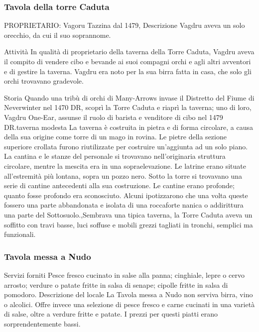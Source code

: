 \documentclass{article}
\begin{document}
              \subsubsection{Tavola della torre Caduta}
PROPRIETARIO: Vagoru Tazzina dal 1479, Descrizione
Vagdru aveva un solo orecchio, da cui il suo soprannome.


Attività
In qualità di proprietario della taverna della Torre Caduta, Vagdru aveva il compito di vendere cibo e bevande ai suoi compagni orchi e agli altri avventori e di gestire la taverna. Vagdru era noto per la sua birra fatta in casa, che solo gli orchi trovavano gradevole.

Storia
Quando una tribù di orchi di Many-Arrows invase il Distretto del Fiume di Neverwinter nel 1470 DR, scoprì la Torre Caduta e riaprì la taverna; uno di loro, Vagdru One-Ear, assunse il ruolo di barista e venditore di cibo nel 1479 DR.taverna modesta
La taverna è costruita in pietra e di forma circolare, a causa della sua origine come torre di un mago in rovina. Le pietre della sezione superiore crollata furono riutilizzate per costruire un'aggiunta ad un solo piano. La cantina e le stanze del personale si trovavano nell'originaria struttura circolare, mentre la mescita era in una sopraelevazione. Le latrine erano situate all'estremità più lontana, sopra un pozzo nero. Sotto la torre si trovavano una serie di cantine antecedenti alla sua costruzione. Le cantine erano profonde; quanto fosse profondo era sconosciuto. Alcuni ipotizzarono che una volta queste fossero una parte abbandonata e isolata di una roccaforte nanica o addirittura una parte del Sottosuolo.,Sembrava una tipica taverna, la Torre Caduta aveva un soffitto con travi basse, luci soffuse e mobili grezzi tagliati in tronchi, semplici ma funzionali.
              \subsubsection{Tavola messa a Nudo}
Servizi forniti\newline
Pesce fresco cucinato in salse alla panna; cinghiale, lepre o cervo arrosto; verdure o patate fritte in salsa di senape; cipolle fritte in salsa di pomodoro.\newline
Descrizione del locale\newline
La Tavola messa a Nudo non serviva birra, vino o alcolici. Offre invece una selezione di pesce fresco e carne cucinati in una varietà di salse, oltre a verdure fritte e patate. I prezzi per questi piatti erano sorprendentemente bassi.
\end{document}
